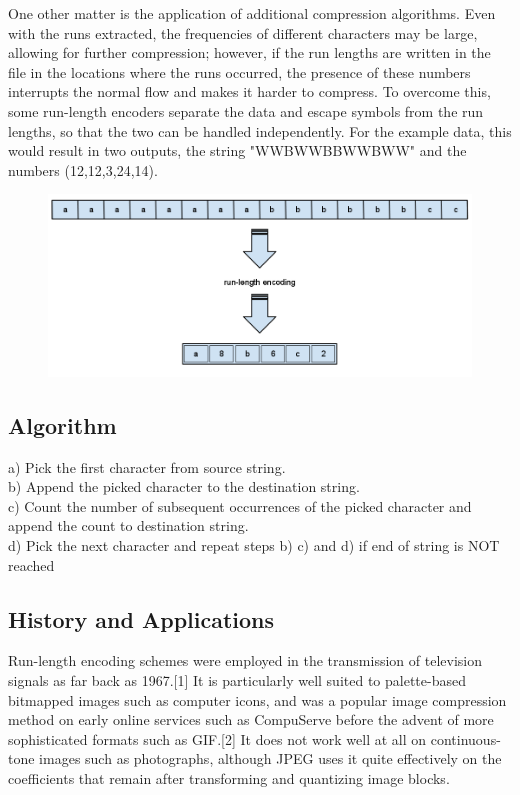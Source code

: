 \documentclass[15pt,a4paper]{article}
\begin{document}
	One other matter is the application of additional compression algorithms. Even with the runs extracted, the frequencies of different characters may be large, allowing for further compression; however, if the run lengths are written in the file in the locations where the runs occurred, the presence of these numbers interrupts the normal flow and makes it harder to compress. To overcome this, some run-length encoders separate the data and escape symbols from the run lengths, so that the two can be handled independently. For the example data, this would result in two outputs, the string "WWBWWBBWWBWW" and the numbers (12,12,3,24,14).
	
	\begin{figure}
		\includegraphics[width=150mm]{download.png}
	\end{figure}
	
	\subsection{Algorithm}
	a) Pick the first character from source string.\\
	b) Append the picked character to the destination string.\\
	c) Count the number of subsequent occurrences of the picked character and append the count to destination string.\\
	d) Pick the next character and repeat steps b) c) and d) if end of string is NOT reached
	
	\subsection{History and Applications}
	Run-length encoding schemes were employed in the transmission of television signals as far back as 1967.[1] It is particularly well suited to palette-based bitmapped images such as computer icons, and was a popular image compression method on early online services such as CompuServe before the advent of more sophisticated formats such as GIF.[2] It does not work well at all on continuous-tone images such as photographs, although JPEG uses it quite effectively on the coefficients that remain after transforming and quantizing image blocks.
	
\end{document}
